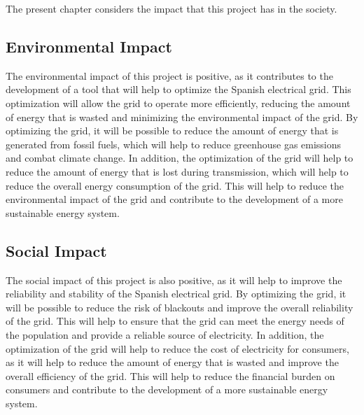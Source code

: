 The present chapter considers the impact that this project has in the society.

\subsection{Environmental Impact}

The environmental impact of this project is positive, as it contributes to the development of a tool that will help to optimize the Spanish electrical grid. This optimization will allow the grid to operate more efficiently, 
reducing the amount of energy that is wasted and minimizing the environmental impact of the grid. By optimizing the grid, it will be possible to reduce the amount of energy that is generated from fossil fuels, which will help 
to reduce greenhouse gas emissions and combat climate change. In addition, the optimization of the grid will help to reduce the amount of energy that is lost during transmission, which will help to reduce the overall energy 
consumption of the grid. This will help to reduce the environmental impact of the grid and contribute to the development of a more sustainable energy system.

\subsection{Social Impact}

The social impact of this project is also positive, as it will help to improve the reliability and stability of the Spanish electrical grid. By optimizing the grid, it will be possible to reduce the risk of blackouts and
improve the overall reliability of the grid. This will help to ensure that the grid can meet the energy needs of the population and provide a reliable source of electricity. In addition, the optimization of the grid will help
to reduce the cost of electricity for consumers, as it will help to reduce the amount of energy that is wasted and improve the overall efficiency of the grid. This will help to reduce the financial burden on consumers and
contribute to the development of a more sustainable energy system.
